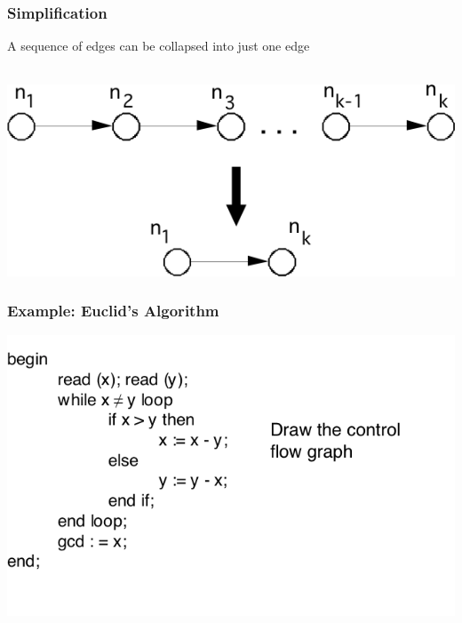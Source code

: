 \documentclass[t,12pt,numbers,fleqn]{beamer}
\begin{document}
\begin{frame}
\frametitle{Simplification}

A sequence of edges can be collapsed into just one edge\\
~\newline

\includegraphics[scale=0.5]{../Figures/Simplification.png}

\end{frame}


\begin{frame}
\frametitle{Example: Euclid's Algorithm}

\includegraphics[scale=0.5]{../Figures/EuclidsAlgorithmNoGraph.png}

\end{frame}

\end{document}
